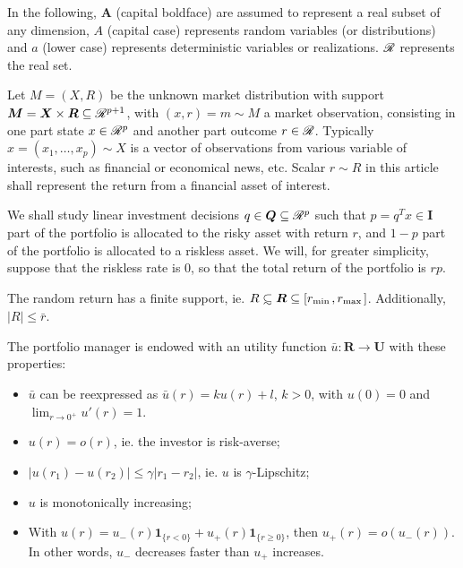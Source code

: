 \documentclass[11pt]{article}
\begin{document}
In the following, $\bm A$ (capital boldface) are assumed to represent a real subset of any
dimension, $A$ (capital case) represents random variables (or distributions) and $a$
(lower case) represents deterministic variables or realizations. $\mathscr{R}$ represents the
real set.

Let $M=(X,R)$ be the unknown market distribution with support
$\bm M = \bm X\times \bm R \subseteq\mathscr{R}^{p+1}$, with $(x,r) = m\sim M$ a market
observation, consisting in one part state $x\in\mathscr{R}^p$ and another part outcome
$r\in\mathscr{R}$. Typically $x=(x_1,\dots,x_p)\sim X$ is a vector of observations from various
variable of interests, such as financial or economical news, etc. Scalar $r\sim R$ in this
article shall represent the return from a financial asset of interest. 


We shall study linear investment decisions $q\in\bm Q\subseteq\mathscr{R}^p$ such that
$p=q^Tx\in\bm I$ part of the portfolio is allocated to the risky asset with return $r$,
and $1-p$ part of the portfolio is allocated to a riskless asset. We will, for greater
simplicity, suppose that the riskless rate is $0$, so that the total return of the
portfolio is $rp$. 



\begin{assumption}
  The random return has a finite support, ie.
  $R\subsetsim \bm R \subseteq [r_{\min{}},r_{\max{}}]$. Additionally, $|R|\leq \bar r$.
\end{assumption}

\begin{assumption}
  The portfolio manager is endowed with an utility function $\bar u:\bm R\to \bm U$ with
  these properties:
  \begin{itemize}[noitemsep,topsep=0pt]
  \item $\bar u$ can be reexpressed as $\bar u(r) = ku(r) + l$, $k>0$, with $u(0) = 0$ and
    $\lim_{r\to0^+}u'(r) = 1$.
  \item $u(r) = o(r)$, ie. the investor is risk-averse;
  \item $|u(r_1) - u(r_2)| \leq \gamma|r_1-r_2|$, ie. $u$ is $\gamma$-Lipschitz;
  \item $u$ is monotonically increasing;
  \item With $u(r) = u_-(r)\bm1_{\{r<0\}}+u_+(r)\bm 1_{\{r\geq0\}}$, then $u_+(r) =
    o(u_-(r))$. In other words, $u_-$ decreases faster than $u_+$ increases. 
  \end{itemize}
\end{assumption}
\end{document}
